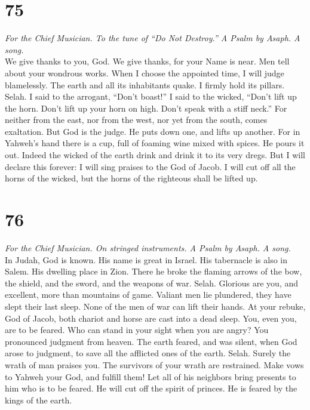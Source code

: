 \hypertarget{section-74}{%
\section{75}\label{section-74}}

\emph{For the Chief Musician. To the tune of ``Do Not Destroy.'' A Psalm
by Asaph. A song.}\\
 We give thanks to you, God. We give thanks, for your Name
is near. Men tell about your wondrous works.  When I
choose the appointed time, I will judge blamelessly.  The
earth and all its inhabitants quake. I firmly hold its pillars. Selah.
 I said to the arrogant, ``Don't boast!'' I said to the
wicked, ``Don't lift up the horn.  Don't lift up your horn
on high. Don't speak with a stiff neck.''  For neither
from the east, nor from the west, nor yet from the south, comes
exaltation.  But God is the judge. He puts down one, and
lifts up another.  For in Yahweh's hand there is a cup,
full of foaming wine mixed with spices. He pours it out. Indeed the
wicked of the earth drink and drink it to its very dregs. 
But I will declare this forever: I will sing praises to the God of
Jacob.  I will cut off all the horns of the wicked, but
the horns of the righteous shall be lifted up.

\hypertarget{section-75}{%
\section{76}\label{section-75}}

\emph{For the Chief Musician. On stringed instruments. A Psalm by Asaph.
A song.}\\
 In Judah, God is known. His name is great in Israel.
 His tabernacle is also in Salem. His dwelling place in
Zion.  There he broke the flaming arrows of the bow, the
shield, and the sword, and the weapons of war. Selah. 
Glorious are you, and excellent, more than mountains of game.
 Valiant men lie plundered, they have slept their last
sleep. None of the men of war can lift their hands.  At
your rebuke, God of Jacob, both chariot and horse are cast into a dead
sleep.  You, even you, are to be feared. Who can stand in
your sight when you are angry?  You pronounced judgment
from heaven. The earth feared, and was silent,  when God
arose to judgment, to save all the afflicted ones of the earth. Selah.
 Surely the wrath of man praises you. The survivors of
your wrath are restrained.  Make vows to Yahweh your God,
and fulfill them! Let all of his neighbors bring presents to him who is
to be feared.  He will cut off the spirit of princes. He
is feared by the kings of the earth.

